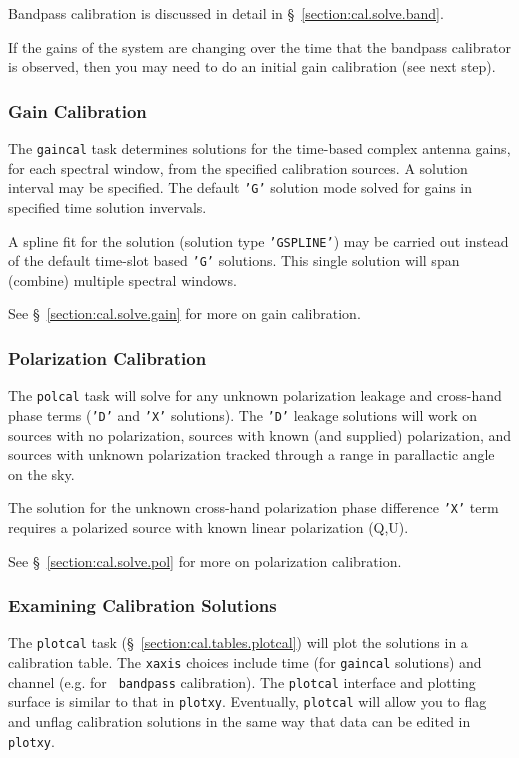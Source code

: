 Bandpass calibration is discussed in detail in
\S~\ref{section:cal.solve.band}.

If the gains of the system are changing over the time that the
bandpass calibrator is observed, then you may need to do an initial
gain calibration (see next step).

\subsubsection{Gain Calibration}
\label{section:intro.walkthru.calib.gaincal}

The {\tt gaincal} task determines solutions for the time-based complex
antenna gains, for each spectral window, from the specified
calibration sources.  A solution interval may be specified. The
default {\tt 'G'} solution mode solved for gains in specified
time solution invervals.

A spline fit for the solution (solution type {\tt 'GSPLINE'}) may be
carried out instead of the default time-slot based {\tt 'G'} solutions.
This single solution will span (combine) multiple spectral windows.

See \S~\ref{section:cal.solve.gain} for more on gain calibration.

\subsubsection{Polarization Calibration}
\label{section:intro.walkthru.calib.polcal}

The {\tt polcal} task will solve for any unknown polarization leakage
and cross-hand phase terms ({\tt 'D'} and {\tt 'X'} solutions).  The
{\tt 'D'} leakage solutions will work on sources with no polarization, sources
with known (and supplied) polarization, and sources with unknown
polarization tracked through a range in parallactic angle on the sky.

The solution for the unknown cross-hand polarization phase difference
{\tt 'X'} term requires a polarized source with known linear
polarization (Q,U).

See \S~\ref{section:cal.solve.pol} for more on polarization calibration.

\subsubsection{Examining Calibration Solutions}
\label{section:intro.walkthru.calib.plotcal}

The {\tt plotcal} task (\S~\ref{section:cal.tables.plotcal}) will plot the
solutions in a calibration table.  The {\tt xaxis} choices include
time (for {\tt gaincal} solutions) and channel (e.g. for {\tt
bandpass} calibration).  
The {\tt plotcal} interface and plotting surface is similar to that in
{\tt plotxy}.  Eventually, {\tt plotcal} will allow you to flag and
unflag calibration solutions in the same way that data can be edited
in {\tt plotxy}.

